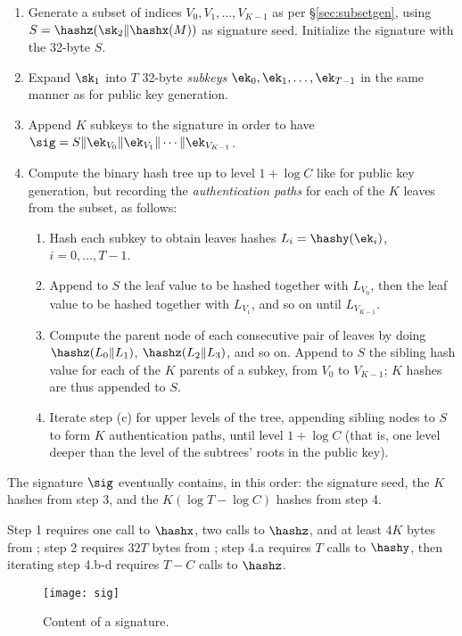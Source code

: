 \begin{enumerate}

\item Generate a subset of indices $V_0, V_1,\dots,V_{K-1}$ as per \S\ref{sec:subsetgen}, using $S=\hashz(\sk_2 \Vert \hashx(M))$ as signature seed. Initialize the signature with the 32-byte $S$.

\item Expand $\sk_1$ into $T$ 32-byte \emph{subkeys} $\ek_0, \ek_1, \dots, \ek_{T-1}$ in the same manner as for public key generation.

\item Append $K$ subkeys to the signature in order to have $\sig= S \Vert \ek_{V_0}\Vert \ek_{V_1}\Vert \cdots \Vert \ek_{V_{K-1}}$.

\item Compute the binary hash tree up to level $1 + \log C$ like for public key generation, but recording the \emph{authentication paths} for each of the $K$ leaves from the subset, as follows:
\begin{enumerate}
\item Hash each subkey to obtain leaves hashes $L_i=\hashy(\ek_i)$, $i=0,\dots,T-1$.
\item Append to $S$ the leaf value to be hashed together with $L_{V_0}$, then the leaf value to be hashed together with $L_{V_1}$, and so on until $L_{V_{K-1}}$.
\item Compute the parent node of each consecutive pair of leaves by doing $\hashz(L_0\Vert L_1)$, $\hashz(L_2\Vert L_3)$, and so on. Append to $S$ the sibling hash value for each of the $K$ parents of a subkey, from $V_0$ to $V_{K-1}$; $K$ hashes are thus appended to $S$.
\item Iterate step (c) for upper levels of the tree, appending sibling nodes to $S$ to form $K$ authentication paths, until level $1 + \log C$ (that is, one level deeper than the level of the subtrees' roots in the public key).
\end{enumerate}
\end{enumerate}
The signature $\sig$ eventually contains, in this order: the signature seed, the $K$ hashes from step 3, and the $K(\log T - \log C)$ hashes from step 4.

Step 1 requires one call to $\hashx$, two calls to $\hashz$, and at least $4K$ bytes from \drbg; step 2 requires $32T$ bytes from \drbg; step 4.a requires $T$ calls to $\hashy$, then iterating step 4.b-d requires $T-C$ calls to $\hashz$.


\begin{figure}
\texttt{[image: sig]}
\caption{Content of a signature.}
\end{figure}

